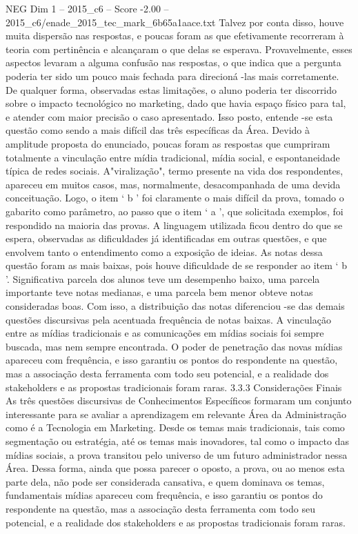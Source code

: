 \begin{textsample}{NEG Dim 1 – 2015\_c6 – Score -2.00 – 2015\_c6/enade\_2015\_tec\_mark\_6b65a1aace.txt}
Talvez por conta disso, houve muita dispersão nas respostas, e poucas foram as que efetivamente recorreram à teoria com pertinência e alcançaram o que delas se esperava.
Provavelmente, esses aspectos levaram a alguma confusão nas respostas, o que indica que a pergunta poderia ter sido um pouco mais fechada para direcioná -las mais corretamente.
De qualquer forma, observadas estas limitações, o aluno poderia ter discorrido sobre o impacto tecnológico no marketing, dado que havia espaço físico para tal, e atender com maior precisão o caso apresentado.
Isso posto, entende -se esta questão como sendo a mais difícil das três específicas da Área.
Devido à amplitude proposta do enunciado, poucas foram as respostas que cumpriram totalmente a vinculação entre mídia tradicional, mídia social, e espontaneidade típica de redes sociais.
A"viralização", termo presente na vida dos respondentes, apareceu em muitos casos, mas, normalmente, desacompanhada de uma devida conceituação.
Logo, o item ‘ b ’ foi claramente o mais difícil da prova, tomado o gabarito como parâmetro, ao passo que o item ‘ a ’, que solicitada exemplos, foi respondido na maioria das provas.
A linguagem utilizada ficou dentro do que se espera, observadas as dificuldades já identificadas em outras questões, e que envolvem tanto o entendimento como a exposição de ideias.
As notas dessa questão foram as mais baixas, pois houve dificuldade de se responder ao item ‘ b ’.
Significativa parcela dos alunos teve um desempenho baixo, uma parcela importante teve notas medianas, e uma parcela bem menor obteve notas consideradas boas.
Com isso, a distribuição das notas diferenciou -se das demais questões discursivas pela acentuada frequência de notas baixas.
A vinculação entre as mídias tradicionais e as comunicações em mídias sociais foi sempre buscada, mas nem sempre encontrada.
O poder de penetração das novas mídias apareceu com frequência, e isso garantiu os pontos do respondente na questão, mas a associação desta ferramenta com todo seu potencial, e a realidade dos stakeholders e as propostas tradicionais foram raras. 3.3.3 Considerações Finais As três questões discursivas de Conhecimentos Específicos formaram um conjunto interessante para se avaliar a aprendizagem em relevante Área da Administração como é a Tecnologia em Marketing.
Desde os temas mais tradicionais, tais como segmentação ou estratégia, até os temas mais inovadores, tal como o impacto das mídias sociais, a prova transitou pelo universo de um futuro administrador nessa Área.
Dessa forma, ainda que possa parecer o oposto, a prova, ou ao menos esta parte dela, não pode ser considerada cansativa, e quem dominava os temas, fundamentais mídias apareceu com frequência, e isso garantiu os pontos do respondente na questão, mas a associação desta ferramenta com todo seu potencial, e a realidade dos stakeholders e as propostas tradicionais foram raras.

\end{textsample}

